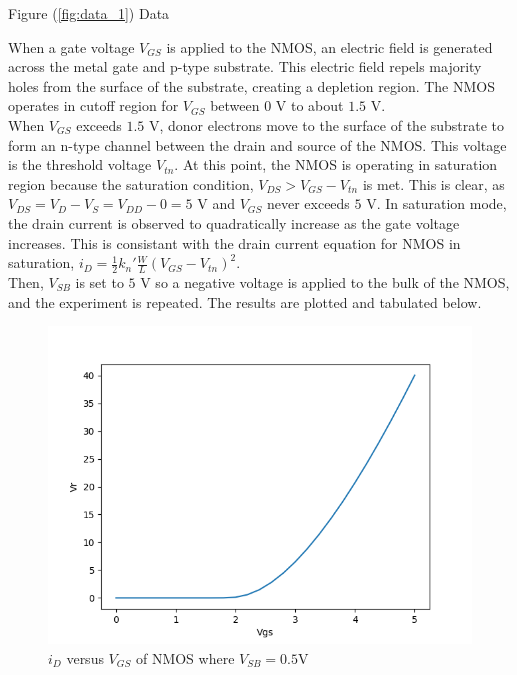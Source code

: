 \FloatBarrier

\begin{table}[h!]
	\centering
	\caption{Figure (\ref{fig:data_1}) Data}
	\label{tab:data_1}
\end{table}

\FloatBarrier

When a gate voltage $V_{GS}$ is applied to the NMOS, an electric field is generated across the metal gate and p-type substrate. 
This electric field repels majority holes from the surface of the substrate, creating a depletion region. 
The NMOS operates in cutoff region for $V_{GS}$ between $0$ \si{\volt} to about $1.5$ \si{\volt}. \\

When $V_{GS}$ exceeds $1.5$ \si{\volt}, donor electrons move to the surface of the substrate to form an n-type channel between the drain and source of the NMOS. 
This voltage is the threshold voltage $V_{tn}$. 
At this point, the NMOS is operating in saturation region because the saturation condition, $V_{DS} > V_{GS} - V_{tn}$ is met.
This is clear, as $V_{DS} = V_D - V_S = V_{DD} - 0 = 5$ \si{\volt} and $V_{GS}$ never exceeds $5$ \si{\volt}.
In saturation mode, the drain current is observed to quadratically increase as the gate voltage increases.
This is consistant with the drain current equation for NMOS in saturation, $i_D = \frac{1}{2}k_n' \frac{W}{L} (V_{GS} - V_{tn})^2$. \\

Then, $V_{SB}$ is set to $5$ \si{\volt} so a negative voltage is applied to the bulk of the NMOS, and the experiment is repeated.
The results are plotted and tabulated below. \\

\FloatBarrier

\begin{figure}[h!]
	\centering
	\includegraphics[scale=0.75]{../images/data_1_lower_body.PNG}
	\caption{$i_{D}$ versus $V_{GS}$ of NMOS where $V_{SB}= 0.5$\si{\volt}}
	\label{fig:data_1_b}
\end{figure}

